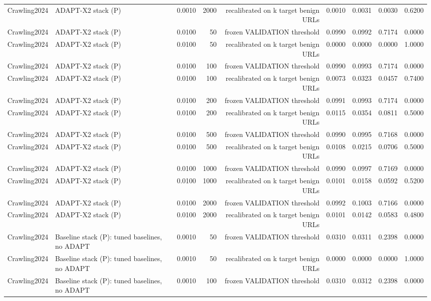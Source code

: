 \begin{table}[t]
\begin{tabular}{llrrrrrrr}
Crawling2024 & ADAPT-X2 stack (P) & 0.0010 & 2000 & recalibrated on k target benign URLs & 0.0010 & 0.0031 & 0.0030 & 0.6200 \\
Crawling2024 & ADAPT-X2 stack (P) & 0.0100 & 50 & frozen VALIDATION threshold & 0.0990 & 0.0992 & 0.7174 & 0.0000 \\
Crawling2024 & ADAPT-X2 stack (P) & 0.0100 & 50 & recalibrated on k target benign URLs & 0.0000 & 0.0000 & 0.0000 & 1.0000 \\
Crawling2024 & ADAPT-X2 stack (P) & 0.0100 & 100 & frozen VALIDATION threshold & 0.0990 & 0.0993 & 0.7174 & 0.0000 \\
Crawling2024 & ADAPT-X2 stack (P) & 0.0100 & 100 & recalibrated on k target benign URLs & 0.0073 & 0.0323 & 0.0457 & 0.7400 \\
Crawling2024 & ADAPT-X2 stack (P) & 0.0100 & 200 & frozen VALIDATION threshold & 0.0991 & 0.0993 & 0.7174 & 0.0000 \\
Crawling2024 & ADAPT-X2 stack (P) & 0.0100 & 200 & recalibrated on k target benign URLs & 0.0115 & 0.0354 & 0.0811 & 0.5000 \\
Crawling2024 & ADAPT-X2 stack (P) & 0.0100 & 500 & frozen VALIDATION threshold & 0.0990 & 0.0995 & 0.7168 & 0.0000 \\
Crawling2024 & ADAPT-X2 stack (P) & 0.0100 & 500 & recalibrated on k target benign URLs & 0.0108 & 0.0215 & 0.0706 & 0.5000 \\
Crawling2024 & ADAPT-X2 stack (P) & 0.0100 & 1000 & frozen VALIDATION threshold & 0.0990 & 0.0997 & 0.7169 & 0.0000 \\
Crawling2024 & ADAPT-X2 stack (P) & 0.0100 & 1000 & recalibrated on k target benign URLs & 0.0101 & 0.0158 & 0.0592 & 0.5200 \\
Crawling2024 & ADAPT-X2 stack (P) & 0.0100 & 2000 & frozen VALIDATION threshold & 0.0992 & 0.1003 & 0.7166 & 0.0000 \\
Crawling2024 & ADAPT-X2 stack (P) & 0.0100 & 2000 & recalibrated on k target benign URLs & 0.0101 & 0.0142 & 0.0583 & 0.4800 \\
Crawling2024 & Baseline stack (P): tuned baselines, no ADAPT & 0.0010 & 50 & frozen VALIDATION threshold & 0.0310 & 0.0311 & 0.2398 & 0.0000 \\
Crawling2024 & Baseline stack (P): tuned baselines, no ADAPT & 0.0010 & 50 & recalibrated on k target benign URLs & 0.0000 & 0.0000 & 0.0000 & 1.0000 \\
Crawling2024 & Baseline stack (P): tuned baselines, no ADAPT & 0.0010 & 100 & frozen VALIDATION threshold & 0.0310 & 0.0312 & 0.2398 & 0.0000 \\

\end{tabular}
\end{table}
